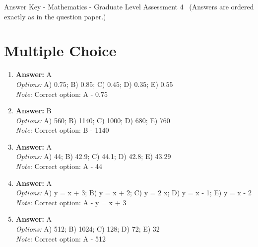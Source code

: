 \documentclass[12pt]{article}
\begin{document}
\begin{center}
Answer Key - Mathematics - Graduate Level Assessment 4 \
\small (Answers are ordered exactly as in the question paper.)
\end{center}

\section*{Multiple Choice}
\begin{enumerate}[label=\arabic*.]
\item \textbf{Answer:} A
\\ \textit{Options:} A) $0.75$; B) $0.85$; C) $0.45$; D) $0.35$; E) $0.55$
\\ \textit{Note:} Correct option: A - $0.75$
\item \textbf{Answer:} B
\\ \textit{Options:} A) 560; B) 1140; C) 1000; D) 680; E) 760
\\ \textit{Note:} Correct option: B - 1140
\item \textbf{Answer:} A
\\ \textit{Options:} A) 44; B) 42.9; C) 44.1; D) 42.8; E) 43.29
\\ \textit{Note:} Correct option: A - 44
\item \textbf{Answer:} A
\\ \textit{Options:} A) y = x + 3; B) y = x + 2; C) y = 2 x; D) y = x - 1; E) y = x - 2
\\ \textit{Note:} Correct option: A - y = x + 3
\item \textbf{Answer:} A
\\ \textit{Options:} A) 512; B) 1024; C) 128; D) 72; E) 32
\\ \textit{Note:} Correct option: A - 512
\end{enumerate}
\end{document}
